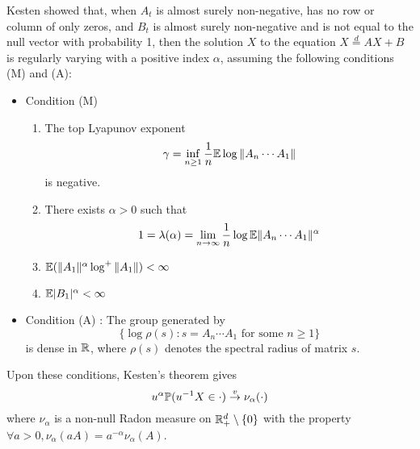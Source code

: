 Kesten \cite{kesten:1973} showed that, when $A_t$ is almost
surely non-negative, has no row or column of only zeros, and
$B_t$ is almost surely non-negative and is not equal to the null
vector with probability 1, then the solution $X$ to the equation
$X \overset{d}{=} A X + B$ is regularly varying with a positive index
$\alpha$, assuming the following conditions (M) and (A):
\begin{itemize}
\item Condition (M)
  \begin{enumerate}
  \item The top Lyapunov exponent
    \[
    \gamma = \inf_{n \geq 1} {1 \over n}\mathbb{E} \log \|A_n \cdots A_1\|
    \]
    is negative.
  \item There exists $\alpha > 0$ such that
    \[
    1 = \lambda(\alpha) = \lim_{n \to \infty} {1 \over n} \log \mathbb{E}
    \|A_n \cdots A_1\|^\alpha
    \]
  \item $\mathbb{E} (\|A_1\|^\alpha \log^+\|A_1\|) < \infty$
  \item $\mathbb{E} |B_1|^\alpha < \infty$
  \end{enumerate}
\item Condition (A) : The group generated by
  \[
  \{\log\rho(s): s = A_n \cdots A_1 \text{ for some } n \geq 1\}
  \]
  is dense in $\mathbb R$, where $\rho(s)$ denotes the spectral
  radius of matrix $s$.
\end{itemize}
Upon these conditions, Kesten's theorem gives
\begin{equation}
  \label{eq:jorg}
  u^\alpha \P(u^{-1} X \in \cdot) \overset{v}{\to} \nu_\alpha(\cdot)
\end{equation}
where $\nu_\alpha$ is a non-null Radon measure on
$\mathbb R^d_+ \setminus \{0\}$ with the property
$\forall a > 0, \nu_\alpha(a A) = a^{-\alpha} \nu_\alpha(A)$.

